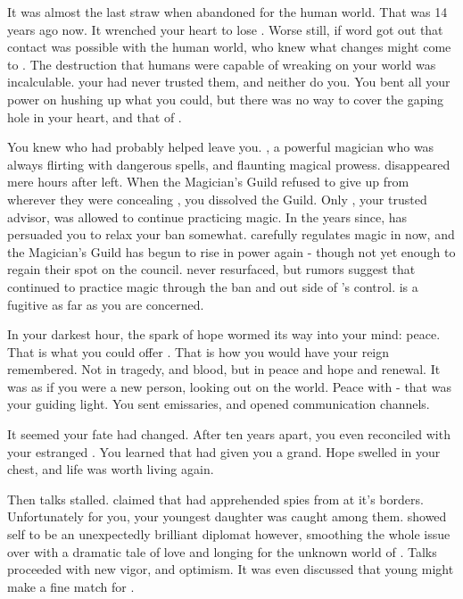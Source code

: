 \documentclass[char]{NeptuneBall}
\begin{document}
It was almost the last straw when \cAriel{\Prince} \cAriel{} abandoned \pAtlantis{} for the human world. That was 14 years ago now.  It wrenched your heart to lose \cAriel{\them{}}. Worse still, if word got out that contact was possible with the human world, who knew what changes might come to \pAtlantis{}. The destruction that humans were capable of wreaking on your world was incalculable. your \cExKing{\parent} had never trusted them, and neither do you. You bent all your power on hushing up what you could, but there was no way to cover the gaping hole in your heart, and that of \pAtlantis{}. 

You knew who had probably helped \cAriel{} leave you. \cWitch{}, a powerful magician who was always flirting with dangerous spells, and flaunting \cWitch{\their} magical prowess. \cWitch{\They} disappeared mere hours after \cAriel{} left. When the Magician's Guild refused to give \cWitch{\them} up from wherever they were concealing \cWitch{\them}, you dissolved the Guild. Only \cManta{}, your trusted advisor, was allowed to continue practicing magic. In the years since, \cManta{} has persuaded you to relax your ban somewhat. \cManta{} carefully regulates magic in \pAtlantis{} now, and the Magician's Guild has begun to rise in power again - though not yet enough to regain their spot on the council. \cWitch{} never resurfaced, but rumors suggest that \cWitch{\they} continued to practice magic through the ban and out side of \cManta{}'s control. \cWitch{} is a fugitive as far as you are concerned.

In your darkest hour, the spark of hope wormed its way into your mind: peace. That is what you could offer \pAtlantis{}. That is how you would have your reign remembered. Not in tragedy, and blood, but in peace and hope and renewal. It was as if you were a new person, looking out on the world. Peace with \pPacifica{} - that was your guiding light. You sent emissaries, and opened communication channels. 

It seemed your fate had changed. After ten years apart, you even reconciled with your estranged \cAriel{\offspring} \cAriel{}.  You learned that \cAriel{} had given you a grand\cWillow{\offspring}. Hope swelled in your chest, and life was worth living again.  

Then talks stalled. \pPacifica{} claimed that had apprehended spies from \pAtlantis{} at it's borders. Unfortunately for you, your youngest daughter \cPrincess{} was caught among them. \cPrincess{\They} showed \cPrincess{\them}self to be an unexpectedly brilliant diplomat however, smoothing the whole issue over with a dramatic tale of love and longing for the unknown world of \pPacifica{}. Talks proceeded with new vigor, and optimism. It was even discussed that young \cPrince{\prince} \cPrince{} might make a fine match for \cPrincess{}.
\end{document}
